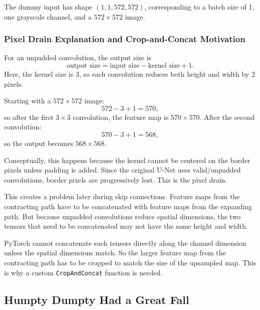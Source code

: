 \documentclass[11pt,a4paper]{article}
\begin{document}
The dummy input has shape \((1,1,572,572)\), corresponding to a batch size of 1, one grayscale channel, and a \(572\times 572\) image.

\subsubsection{Pixel Drain Explanation and Crop-and-Concat Motivation}
For an unpadded convolution, the output size is
\[
\text{output size} = \text{input size} - \text{kernel size} + 1.
\]
Here, the kernel size is 3, so each convolution reduces both height and width by 2 pixels.

Starting with a \(572\times 572\) image:
\[
572 - 3 + 1 = 570,
\]
so after the first \(3\times 3\) convolution, the feature map is \(570\times 570\). After the second convolution:
\[
570 - 3 + 1 = 568,
\]
so the output becomes \(568\times 568\).

Conceptually, this happens because the kernel cannot be centered on the border pixels unless padding is added. Since the original U-Net uses valid/unpadded convolutions, border pixels are progressively lost. This is the pixel drain.

This creates a problem later during skip connections. Feature maps from the contracting path have to be concatenated with feature maps from the expanding path. But because unpadded convolutions reduce spatial dimensions, the two tensors that need to be concatenated may not have the same height and width.

PyTorch cannot concatenate such tensors directly along the channel dimension unless the spatial dimensions match. So the larger feature map from the contracting path has to be cropped to match the size of the upsampled map. This is why a custom \texttt{CropAndConcat} function is needed.

\subsection{Humpty Dumpty Had a Great Fall}
\end{document}
